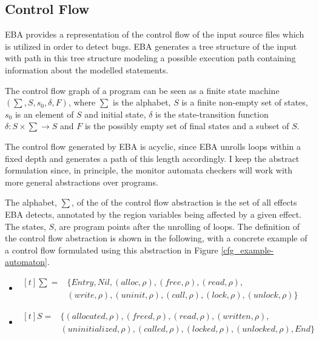 \subsection{Control Flow}

EBA provides a representation of the control flow of the input source files which is utilized in order to detect bugs. EBA generates a tree structure of the input with path in this tree structure modeling a possible execution path containing information about the modelled statements. 

\newpar The control flow graph of a program can be seen as a finite state machine $(\sum, S, s_0, \delta, F)$, where $\sum$ is the alphabet, $S$ is a finite non-empty set of states, $s_0$ is an element of $S$ and initial state, $\delta$ is the state-transition function $\delta: S \times \sum \rightarrow S$ and $F$ is the possibly empty set of final states and a subset of $S$. 

\newpar The control flow generated by EBA is acyclic, since EBA unrolls loops within a fixed depth and generates a path of this length accordingly. I keep the abstract formulation since, in principle, the monitor automata checkers will work with more general abstractions over programs.

\newpar The alphabet, $\sum$, of the of the control flow abstraction is the set of all effects EBA detects, annotated by the region variables being affected by a given effect. The states, $S$, are program points after the unrolling of loops. The definition of the control flow abstraction is shown in the following, with a concrete example of a control flow formulated using this abstraction in Figure \ref{cfg_example-automaton}. 

\begin{itemize}
    \item{
        $
            \begin{aligned}[t] 
                \sum = & \{\mathit{Entry}, \mathit{Nil}, (alloc, \rho), (free, \rho), (read, \rho), \\ & (write, \rho), (uninit, \rho), (call, \rho), (lock, \rho), (unlock, \rho)\}
            \end{aligned} 
        $
    }
    \item{
        $
            \begin{aligned}[t]
                S = & \{(allocated, \rho), (freed, \rho), (read, \rho), (written, \rho),\\ & (uninitialized, \rho), (called, \rho), (locked, \rho), (unlocked, \rho), End\}
            \end{aligned}
        $
    }
\end{itemize}

